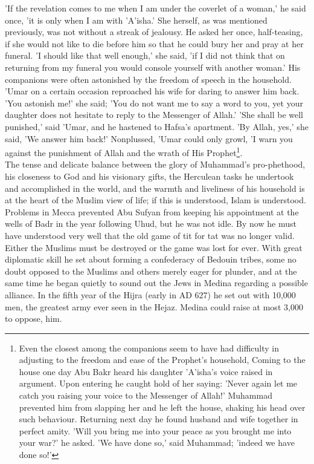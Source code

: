 \documentclass[11pt, b5paper, twoside]{book}
\begin{document}
'If the revelation comes to me when I am under the coverlet of a woman,' he said once, 'it is only 
when I am with 'A'isha.' She herself, as was mentioned previously, was not without a streak of 
jealousy. He asked her once, half-teasing, if she would not like to die before him so that he could 
bury her and pray at her funeral. 'I should like that well enough,' she said, 'if I did not think 
that on returning from my funeral you would console yourself with another woman.' His companions were 
often astonished by the freedom of speech in the household. 'Umar on a certain occasion reproached 
his wife for daring to answer him back. 'You astonish me!' she said; 'You do not want me to say a 
word to you, yet your daughter does not hesitate to reply to the Messenger of Allah.' 'She shall be 
well punished,' said 'Umar, and he hastened to Hafsa's apartment. 'By Allah, yes,' she said, 'We 
answer him back!' Nonplussed, 'Umar could only growl, 'I warn you against the punishment of Allah and 
the wrath of His Prophet\footnote{Even the closest among the companions seem to have had difficulty in adjusting to the freedom and ease of the Prophet's household, Coming to the house one day Abu Bakr heard his daughter 'A'isha's voice raised in argument. Upon entering he caught hold of her saying: 'Never again let me catch you raising your voice to the Messenger of Allah!' Muhammad prevented him from slapping her and he left the house, shaking his head over such behaviour. Returning next day he found husband and wife together in perfect amity. 'Will you bring me into your peace as you brought me into your war?' he asked. 'We have done so,' said Muhammad; 'indeed we have done so!' }.\\

The tense and delicate balance between the glory of Muhammad's pro\hyp{}phethood, his closeness to God and 
his visionary gifts, the Herculean tasks he undertook and accomplished in the world, and the warmth 
and liveliness of his household is at the heart of the Muslim view of life; if this is understood, 
Islam is understood. \\

Problems in Mecca prevented Abu Sufyan from keeping his appointment at the wells of Badr in the year 
following Uhud, but he was not idle. By now he must have understood very well that the old game of 
tit for tat was no longer valid. Either the Muslims must be destroyed or the game was lost for ever. 
With great diplomatic skill he set about forming a confederacy of Bedouin tribes, some no doubt 
opposed to the Muslims and others merely eager for plunder, and at the same time he began quietly to 
sound out the Jews in Medina regarding a possible alliance. In the fifth year of the Hijra (early in 
AD 627) he set out with 10,000 men, the greatest army ever seen in the Hejaz. Medina could raise at 
most 3,000 to oppose, him. \\
\end{document}
